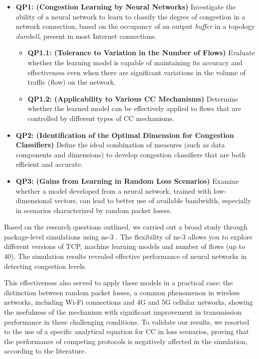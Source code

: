 \documentclass[a4paper,fleqn]{cas-sc}
\begin{document}
\begin{itemize}
	\item \textbf{QP1: (Congestion Learning by Neural Networks)} Investigate the ability of a neural network to learn to classify the degree of congestion in a network connection, based on the occupancy of an output \textit{buffer} in a topology \textit{dumbell}, present in most Internet connections. 
	\begin{itemize}
		\item \textbf{QP1.1: (Tolerance to Variation in the Number of Flows)} Evaluate whether the learning model is capable of maintaining its accuracy and effectiveness even when there are significant variations in the volume of traffic (flow) on the network.
		\item \textbf{QP1.2: (Applicability to Various CC Mechanisms)} Determine whether the learned model can be effectively applied to flows that are controlled by different types of CC mechanisms. 
	\end{itemize}
	\item \textbf{QP2: (Identification of the Optimal Dimension for Congestion Classifiers)} Define the ideal combination of measures (such as data components and dimensions) to develop congestion classifiers that are both efficient and accurate.
	\item \textbf{QP3: (Gains from Learning in Random Loss Scenarios)} Examine whether a model developed from a neural network, trained with low-dimensional vectors, can lead to better use of available bandwidth, especially in scenarios characterized by random packet losses.
\end{itemize}

Based on the research questions outlined, we carried out a broad study through package-level simulations using ns-3 \cite{b0000058}. The flexibility of ns-3 allows you to explore different versions of TCP, machine learning models and number of flows (up to 40). The simulation results revealed effective performance of neural networks in detecting congestion levels.

This effectiveness also served to apply these models in a practical case: the distinction between random packet losses, a common phenomenon in wireless networks, including Wi-Fi connections and 4G and 5G cellular networks, showing the usefulness of the mechanism with significant improvement in transmission performance in these challenging conditions. To validate our results, we resorted to the use of a specific analytical equation for CC in loss scenarios, proving that the performance of competing protocols is negatively affected in the simulation, according to the literature.
\end{document}
